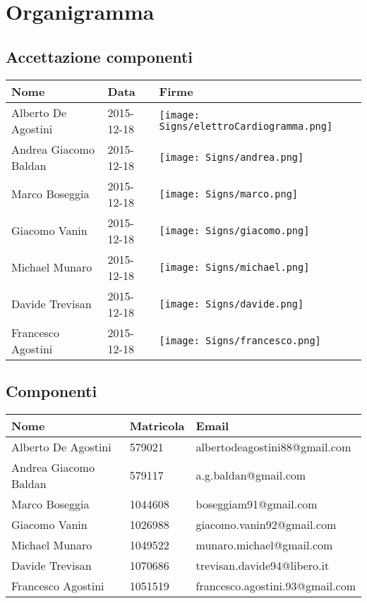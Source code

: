 \documentclass{scalatekids-article}
\begin{document}
\section{Organigramma}
\subsection{Accettazione componenti}
\begin{center}
  \begin{tabular}{|l | l | p{4cm} |}
    \hline
    Nome & Data & Firme \\
    \hline
    Alberto De Agostini & 2015-12-18 & \texttt{[image: Signs/elettroCardiogramma.png]} \\
    Andrea Giacomo Baldan & 2015-12-18 &\texttt{[image: Signs/andrea.png]} \\
    Marco Boseggia & 2015-12-18 &\texttt{[image: Signs/marco.png]} \\
    Giacomo Vanin & 2015-12-18 & \texttt{[image: Signs/giacomo.png]}\\
    Michael Munaro & 2015-12-18 &\texttt{[image: Signs/michael.png]}\\
    Davide Trevisan & 2015-12-18 &\texttt{[image: Signs/davide.png]}\\
    Francesco Agostini & 2015-12-18 &\texttt{[image: Signs/francesco.png]}\\
    \hline
  \end{tabular}
\end{center}
\subsection{Componenti}
\begin{center}
  \begin{tabular}{|l | l | l |}
    \hline
    Nome & Matricola & Email \\
    \hline
    Alberto De Agostini & 579021 & albertodeagostini88@gmail.com\\
    Andrea Giacomo Baldan & 579117 & a.g.baldan@gmail.com\\
    Marco Boseggia & 1044608 & boseggiam91@gmail.com\\
    Giacomo Vanin & 1026988 & giacomo.vanin92@gmail.com\\
    Michael Munaro & 1049522 & munaro.michael@gmail.com\\
    Davide Trevisan & 1070686 & trevisan.davide94@libero.it\\
    Francesco Agostini & 1051519 & francesco.agostini.93@gmail.com\\
    \hline
  \end{tabular}
\end{center}
\newpage
\appendix
\listoftables
\listoffigures
\end{document}
